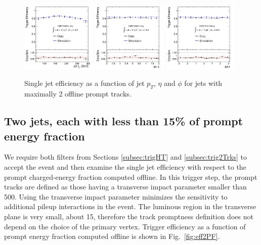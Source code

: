  
\begin{figure}[!h]
\centering
 \includegraphics[width=0.32\textwidth]{plots/trigger/effHT300_2Trk_Pt.pdf}
 \includegraphics[width=0.32\textwidth]{plots/trigger/effHT300_2Trk_Eta.pdf}
 \includegraphics[width=0.32\textwidth]{plots/trigger/effHT300_2Trk_Phi.pdf}
\caption{Single jet efficiency as a function of jet $p_T$, $\eta$ and $\phi$ for jets with maximally 2 offline prompt tracks. \label{fig:eff2Trksptetaphi}}
\end{figure}

\subsection{Two jets, each with less than 15\% of prompt energy fraction}
\label{subsec:trig2PF}

We require both filters from Sections \ref{subsec:trigHT} and \ref{subsec:trig2Trks} 
to accept the event and then
examine the single jet efficiency with respect to the prompt charged-energy
 fraction computed offline. In this trigger step, the prompt tracks are defined
 as those having a transverse impact parameter smaller than 500\micron. 
Using the transverse impact parameter
minimizes the sensitivity to additional pileup interactions in the event. The luminous region in 
the transverse plane is very small, about 15\micron, therefore the track promptness definition does not depend on the choice of the primary vertex. 
Trigger efficiency as a function of prompt energy fraction computed offline is shown in Fig.~\ref{fig:eff2PF}.

